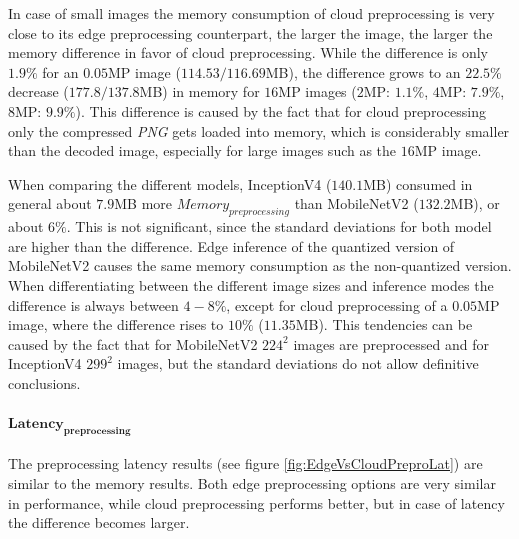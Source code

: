 In case of small images the memory consumption of cloud preprocessing is very close to its edge preprocessing counterpart, the larger the image, the larger the memory difference in favor of cloud preprocessing.
While the difference is only $1.9\%$ for an $0.05$MP image ($114.53/116.69$MB), the difference grows to an $22.5\%$ decrease ($177.8/137.8$MB) in memory for $16$MP images ($2$MP: $1.1\%$, $4$MP: $7.9\%$, $8$MP: $9.9\%$).
This difference is caused by the fact that for cloud preprocessing only the compressed \emph{PNG} gets loaded into memory, which is considerably smaller than the decoded image, especially for large images such as the $16$MP image.

When comparing the different models, InceptionV4 ($140.1$MB) consumed in general about $7.9$MB more $Memory_{preprocessing}$ than MobileNetV2 ($132.2$MB), or about $6\%$. This is not significant, since the standard deviations for both model are higher than the difference.
Edge inference of the quantized version of MobileNetV2 causes the same memory consumption as the non-quantized version.
When differentiating between the different image sizes and inference modes the difference is always between $4-8\%$, except for cloud preprocessing of a $0.05$MP image, where the difference rises to $10\%$ ($11.35$MB). This tendencies can be caused by the fact that for MobileNetV2 $224^2$ images are preprocessed and for InceptionV4 $299^2$ images, but the standard deviations do not allow definitive conclusions.

\paragraph{$\mathbf{Latency_{preprocessing}}$}
The preprocessing latency results (see figure \ref{fig:EdgeVsCloudPreproLat}) are similar to the memory results. Both edge preprocessing options are very similar in performance, while cloud preprocessing performs better, but in case of latency the difference becomes larger.

